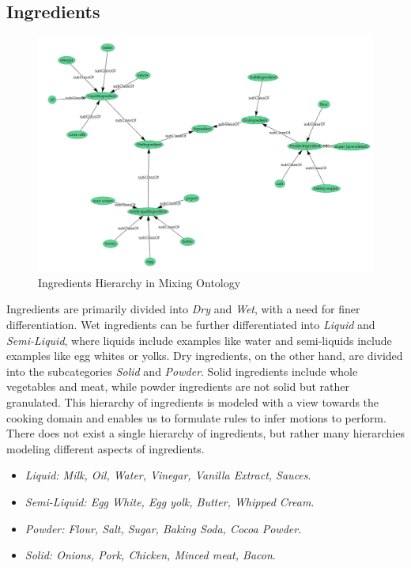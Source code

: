 \subsection{Ingredients}

\begin{figure}[H]
    \includegraphics[scale=0.45]{Graphics/classHierarchy/ingredients_hierarchy.png}
    \centering
    \caption{Ingredients Hierarchy in Mixing Ontology}
\end{figure}

Ingredients are primarily divided into \textit{Dry} and \textit{Wet}, with a need for finer differentiation.
Wet ingredients can be further differentiated into \textit{Liquid} and \textit{Semi-Liquid}, where liquids include examples like water and semi-liquids include examples like egg whites or yolks. 
Dry ingredients, on the other hand, are divided into the subcategories \textit{Solid} and \textit{Powder}. 
Solid ingredients include whole vegetables and meat, while powder ingredients are not solid but rather granulated. 
This hierarchy of ingredients is modeled with a view towards the cooking domain and enables us to formulate rules to infer motions to perform. 
There does not exist a single hierarchy of ingredients, but rather many hierarchies modeling different aspects of ingredients.

\begin{itemize}
    \item \textit{Liquid: Milk, Oil, Water, Vinegar, Vanilla Extract, Sauces}.
    \item \textit{Semi-Liquid: Egg White, Egg yolk, Butter, Whipped Cream}.
    \item \textit{Powder: Flour, Salt, Sugar, Baking Soda, Cocoa Powder}.
    \item \textit{Solid: Onions, Pork, Chicken, Minced meat, Bacon}.
  \end{itemize}

